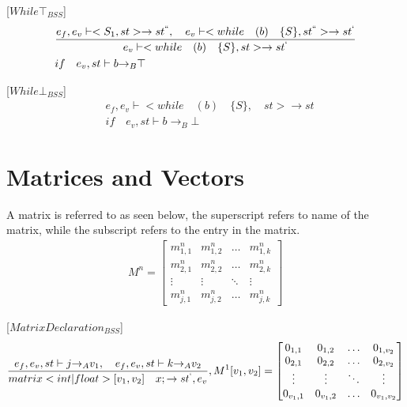 [${While\top}_{BSS}$]
\begin{align*}
	&\frac { { e }_{ f },{ e }_{ v }\vdash <{ S }_{ 1 },st>\rightarrow { st }^{ `` },\quad { e }_{ v }\vdash <while\quad (b)\quad \{S\},{ st }^{ `` }>\rightarrow { st }^{ ` } }{ { e }_{ v }\vdash <while\quad (b)\quad \{S\},st>\rightarrow { st }^{ ` } }\\
	&if\quad { e }_{ v },st\vdash b{ \rightarrow  }_{ B }\top 
\end{align*}


[${While\bot}_{BSS}$]
\begin{align*}
	&{ e }_{ f },{ e }_{ v }\vdash <while\quad (b)\quad \{S\},\quad st>\rightarrow st\\
	&if\quad { e }_{ v },st\vdash b{ \rightarrow  }_{ B }\bot
\end{align*}

\section*{Matrices and Vectors}
A matrix is referred to as seen below, the superscript refers to name of the matrix, while the subscript refers to the entry in the matrix.
\begin{align*}
	M^{n}= \begin{bmatrix} { { m }_{ 1,1 }^{ n } } & { { m }_{ 1,2 }^{ n } } & \dots  & { m }_{ 1,k }^{ n } \\
{ { m }_{ 2,1 }^{ n } }  &  { { m }_{ 2,2 }^{ n } } & \dots & { m }_{ 2,k }^{ n }
\\ \vdots  & \vdots & \ddots  & \vdots \\
 { m }_{ j,1 }^{ n } & { m }_{ j,2 }^{ n } & \dots & { m }_{ j,k }^{ n } \end{bmatrix}
\end{align*}\newline

[${MatrixDeclaration}_{BSS}$]
\begin{equation}
	\frac { { e }_{ f },{ e }_{ v },st\vdash j{ \rightarrow  }_{ A }{ v }_{ 1 },\quad { e }_{ f },{ e }_{ v },st\vdash k{ \rightarrow  }_{ A }{ v }_{ 2 } }{ matrix<int|float>[{ v }_{ 1 },{ v }_{ 2 }]\quad x;\rightarrow { st }^{ ` },{ e }_{ v } } ,{ M }^{ 1 }[{ v }_{ 1 },{ v }_{ 2 }]=\begin{bmatrix} { { 0 }_{ 1,1 } } & 0_{ 1,2 } & \dots  & { 0 }_{ { 1,{ v }_{ 2 } } } \\ 0_{ 2,1 } & 0_{ 2,2 } & \dots  & 0_{ 2,v_{ 2 } } \\ \vdots  & \vdots  & \ddots  & \vdots  \\ { 0 }_{ { v }_{ 1 },1 } & 0_{ v_{ 1 },2 } & \dots  & { 0 }_{ { v }_{ 1 },{ v }_{ 2 } } \end{bmatrix}
\end{equation}\newline



